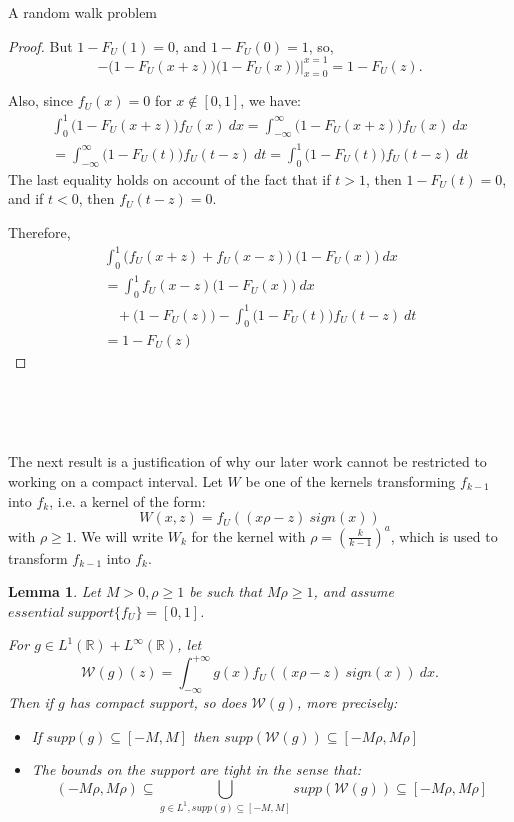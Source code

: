 \documentclass[12pt]{article}
\newtheorem*{lmm}{Lemma}
\begin{document}
\begin{section}{A random walk problem}
\begin{proof}
  	But $1-F_U(1)=0$, and $1-F_U(0)=1$, so,  
  	$$
  	- \big( 1 - F_U(x+z) \big) \big(1 - F_U(x) \big) \Bigg|_{x=0}^{x=1} =
  	1 - F_U(z).
  	$$  
  	
  	Also, since $f_U(x) = 0$ for $x \notin [0,1]$, we have:
  	\begin{align*}
  	&\int_{0}^1  \big( 1 - F_U(x+z) \big) f_U(x)  \ dx = \int_{-\infty}^{\infty}  \big( 1 - F_U(x+z) \big) f_U(x)  \ dx &\\
  	&= \int_{-\infty}^{\infty}  \big( 1 - F_U(t) \big) f_U(t-z)  \ dt = \int_0^1  \big( 1 - F_U(t) \big) f_U(t-z)  \ dt &
  	\end{align*}
  	The last equality holds on account of the fact that if $t > 1$, then $1 - F_U(t) = 0$, and if $t<0$, then $f_U(t-z) = 0 $.  
  	
  	
  	Therefore,
  	\begin{align*}
  	& \int_{0}^1 \big( f_U(x+z) + f_U(x-z) \big) \ \big(1 - F_U(x) \big) \ dx &\\
  	&= \int_{0}^1  f_U(x-z) \big(1 - F_U(x) \big) \ dx  &\\
  	&\ \ \ \ + \big( 1 - F_U(z) \big) - \int_0^1  \big( 1 - F_U(t) \big) f_U(t-z)  \ dt &\\
  	&=  1 - F_U(z)  &
  	\end{align*} 
    \end{proof}  


\

\

The next result is a justification of why our later work cannot be restricted to working on a compact interval. Let $W$ be one of the kernels transforming $f_{k-1}$ into $f_k$, i.e. a kernel of the form:
$$
W(x,z) = f_U\!\left(  \left(x \rho - z \right)\ sign(x) \right)
$$
with $\rho \ge 1$. We will write $W_k$ for the kernel with $\rho = (\frac{k}{k-1})^a$, which is used to transform $f_{k-1}$ into $f_k$.  

\begin{lmm}{} Let $M>0,\rho \ge 1$ be such that $M \rho \ge 1$, and assume  $essential \ support \{ f_U \} = [0,1]$.  
	
	For $g \in L^1(\mathbb{R}) + L^{\infty}(\mathbb{R})$, let 
$$
\mathcal{W}(g)(z)=\int_{-\infty}^{+\infty} g(x) f_U\!\left(  \left(x \rho - z \right)\ sign(x) \right) \ dx .
$$
Then if $g$ has compact support, so does $\mathcal{W}(g)$, more precisely:
\begin{itemize}
	\item[a)] If $supp(g) \subseteq [-M,M]$ then $supp(\mathcal{W}(g)) \subseteq [-M \rho,M \rho]$  
	\item[b)] The bounds on the support are tight in the sense that: 
	$$
	\left(-M \rho, M \rho \right) \subseteq \bigcup_{g \in L^1 , supp(g) \subseteq [-M,M]} supp(\mathcal{W}(g))  \subseteq  
	\left[-M \rho, M \rho \right]
	$$
\end{itemize}
\end{lmm} 


\end{section}
\end{document}
